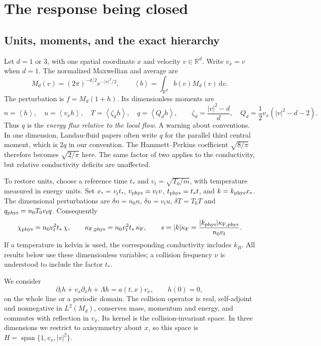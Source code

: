 \documentclass[11pt]{article}
\newcommand{\dd}{\,\mathrm d}
\newcommand{\av}[1]{\left\langle #1\right\rangle}
\newcommand{\F}{\kappa_{\mathrm F}}
\newcommand{\RR}{\mathbb R}
\theoremstyle{definition}
\theoremstyle{remark}
\numberwithin{equation}{section}
\begin{document}
\section{The response being closed}\label{sec:setting}

\subsection{Units, moments, and the exact hierarchy}

Let $d=1$ or $3$, with one spatial coordinate $x$ and velocity
$v\in\RR^d$. Write $v_x=v$ when $d=1$. The normalized Maxwellian and
average are
\[
 M_d(v)=(2\pi)^{-d/2}e^{-|v|^2/2},
 \qquad \av{b}=\int_{\RR^d}b(v)M_d(v)\dd v.
\]
The perturbation is $f=M_d(1+h)$. Its dimensionless moments are
\begin{equation}
 n=\av h,\quad u=\av{v_xh},\quad
 T=\av{\zeta_d h},\quad q=\av{Q_dh},\qquad
 \zeta_d=\frac{|v|^2-d}{d},\quad
 Q_d=\frac12 v_x(|v|^2-d-2).
 \label{eq:moments}
\end{equation}
Thus $q$ is the \emph{energy flux relative to the local flow}.
A warning about conventions. In one dimension, Landau-fluid
papers often write $q$ for the parallel third central moment, which is
$2q$ in our convention. The Hammett--Perkins coefficient $\sqrt{8/\pi}$
therefore becomes $\sqrt{2/\pi}$ here. The same factor of two applies to
the conductivity, but relative conductivity deficits are unaffected.

To restore units, choose a reference time $t_*$ and
$v_t=\sqrt{T_0/m}$, with temperature measured in energy units.
Set $x_*=v_tt_*$, $v_{\rm phys}=v_tv$,
$t_{\rm phys}=t_*t$, and $k=k_{\rm phys}x_*$.
The dimensional perturbations are
$\delta n=n_0n$, $\delta u=v_tu$, $\delta T=T_0T$ and
$q_{\rm phys}=n_0T_0v_tq$. Consequently
\begin{equation}
 \chi_{\rm phys}=n_0v_t^2t_*\,\chi,\qquad
 \kappa_{\mathrm{F,phys}}=n_0v_t^2t_*\,\F,\qquad
 s=|k|\F=\frac{|k_{\rm phys}|\kappa_{\mathrm{F,phys}}}{n_0v_t}.
 \label{eq:units}
\end{equation}
If a temperature in kelvin is used, the corresponding conductivity includes
$k_B$. All results below use these dimensionless variables; a collision
frequency $\nu$ is understood to include the factor $t_*$.

We consider
\begin{equation}
 \partial_th+v_x\partial_xh+\Lambda h=a(t,x)v_x,\qquad h(0)=0,
 \label{eq:kinetic}
\end{equation}
on the whole line or a periodic domain. The collision operator is real,
self-adjoint and nonnegative in $L^2(M_d)$, conserves mass, momentum and
energy, and commutes with reflection in $v_x$. Its kernel is the
collision-invariant space. In three dimensions we restrict to
axisymmetry about $x$, so this space is
$H=\operatorname{span}\{1,v_x,|v|^2\}$.
\end{document}
